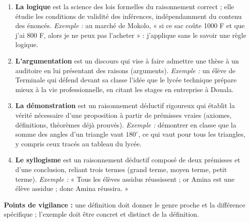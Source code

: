 \documentclass[11pt]{article}
\begin{document}
\begin{corrige}
\begin{enumerate}
\item \textbf{La logique} est la science des lois formelles du raisonnement correct ; elle étudie les conditions de validité des inférences, indépendamment du contenu des énoncés. \emph{Exemple :} au marché de Mokolo, « si ce sac coûte \num{1000} F et que j'ai \num{800} F, alors je ne peux pas l'acheter » : j'applique sans le savoir une règle logique.
\item \textbf{L'argumentation} est un discours qui vise à faire admettre une thèse à un auditoire en lui présentant des raisons (arguments). \emph{Exemple :} un élève de Terminale qui défend devant sa classe l'idée que le lycée technique prépare mieux à la vie professionnelle, en citant les stages en entreprise à Douala.
\item \textbf{La démonstration} est un raisonnement déductif rigoureux qui établit la vérité nécessaire d'une proposition à partir de prémisses vraies (axiomes, définitions, théorèmes déjà prouvés). \emph{Exemple :} démontrer en classe que la somme des angles d'un triangle vaut $180^{\circ}$, ce qui vaut pour tous les triangles, y compris ceux tracés au tableau du lycée.
\item \textbf{Le syllogisme} est un raisonnement déductif composé de deux prémisses et d'une conclusion, reliant trois termes (grand terme, moyen terme, petit terme). \emph{Exemple :} « Tous les élèves assidus réussissent ; or Amina est une élève assidue ; donc Amina réussira. »
\end{enumerate}
\textbf{Points de vigilance :} une définition doit donner le genre proche et la différence spécifique ; l'exemple doit être concret et distinct de la définition.
\end{corrige}
\end{document}
